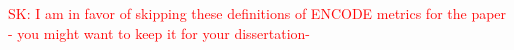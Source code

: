 \documentclass{bmcart}
\newcommand{\SK}[1]{\textcolor{red}{SK: #1}}
\begin{document}
\SK{I am in favor of skipping these definitions of ENCODE metrics  for the paper - you might want to keep it for your dissertation-}









\end{document}
